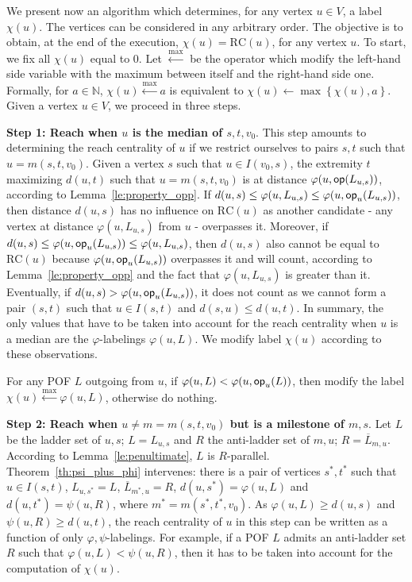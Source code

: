 \documentclass[a4paper,UKenglish,numberwithinsect,cleveref, autoref]{lipics-v2021}
\newcommand{\set}[1]{\left\{ #1 \right\}}
\newcommand{\opp}{\mbox{\textsf{op}}}
\newcommand{\rc}{\mbox{RC}}
\begin{document}
We present now an algorithm which determines, for any vertex $u \in V$, a label $\chi(u)$. The vertices can be considered in any arbitrary order. The objective is to obtain, at the end of the execution, $\chi(u) = \rc(u)$, for any vertex $u$. To start, we fix all $\chi(u)$ equal to 0. Let $\xleftarrow{\max}$ be the operator which modify the left-hand side variable with the maximum between itself and the right-hand side one. Formally, for $a \in \mathbb{N}$, $\chi(u) \xleftarrow{\max} a$ is equivalent to $\chi(u) \leftarrow \max \set{\chi(u),a}$. Given a vertex $u \in V$, we proceed in three steps.

\textbf{Step 1: Reach when $u$ is the median of $s,t,v_0$}. This step amounts to determining the reach centrality of $u$ if we restrict ourselves to pairs $s,t$ such that $u = m(s,t,v_0)$. Given a vertex $s$ such that $u \in I(v_0,s)$, the extremity $t$ maximizing $d(u,t)$ such that $u = m(s,t,v_0)$ is at distance $\varphi(u,\opp(L_{u,s}))$, according to Lemma~\ref{le:property_opp}. If $d(u,s) \le \varphi(u,L_{u,s}) \le \varphi(u,\opp_u(L_{u,s}))$, then distance $d(u,s)$ has no influence on $\rc(u)$ as another candidate - any vertex at distance $\varphi(u,L_{u,s})$ from $u$ - overpasses it. Moreover, if $d(u,s) \le \varphi(u,\opp_u(L_{u,s})) \le \varphi(u,L_{u,s})$, then $d(u,s)$ also cannot be equal to $\rc(u)$ because $\varphi(u,\opp_u(L_{u,s}))$ overpasses it and will count, according to Lemma~\ref{le:property_opp} and the fact that $\varphi(u,L_{u,s})$ is greater than it. Eventually, if $d(u,s) > \varphi(u,\opp_u(L_{u,s}))$, it does not count as we cannot form a pair $(s,t)$ such that $u\in I(s,t)$ and $d(s,u) \le d(u,t)$. In summary, the only values that have to be taken into account for the reach centrality when $u$ is a median are the $\varphi$-labelings $\varphi(u,L)$. We modify label $\chi(u)$ according to these observations.

For any POF $L$ outgoing from $u$, if $\varphi(u,L) < \varphi(u,\opp_u(L))$, then modify the label $\chi(u) \xleftarrow{\max} \varphi(u,L)$, otherwise do nothing.

\textbf{Step 2: Reach when $u\neq m=m(s,t,v_0)$ but is a milestone of $m,s$}. Let $L$ be the ladder set of $u,s$; $L = L_{u,s}$ and $R$ the anti-ladder set of $m,u$; $R = \overline{L}_{m,u}$. According to Lemma~\ref{le:penultimate}, $L$ is $R$-parallel. Theorem~\ref{th:psi_plus_phi} intervenes: there is a pair of vertices $s^*,t^*$ such that $u \in I(s,t)$, $L_{u,s^*} = L$, $\overline{L}_{m^*,u} = R$, $d(u,s^*) = \varphi(u,L)$ and $d(u,t^*) = \psi(u,R)$, where $m^* = m(s^*,t^*,v_0)$. As $\varphi(u,L) \ge d(u,s)$ and $\psi(u,R) \ge d(u,t)$, the  reach centrality of $u$ in this step can be written as a function of only  $\varphi,\psi$-labelings. For example, if a POF $L$ admits an anti-ladder set $R$ such that $\varphi(u,L) < \psi(u,R)$, then it has to be taken into account for the computation of $\chi(u)$.
\end{document}
